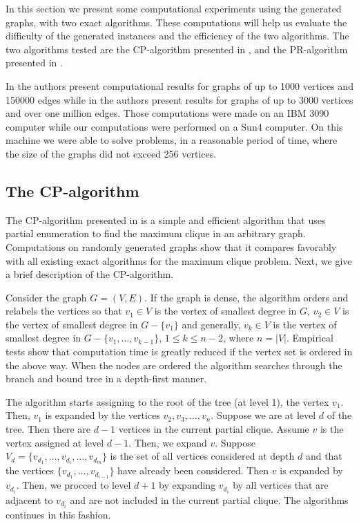 In this section we present some computational experiments using the generated
graphs, with two exact algorithms. These computations will help us evaluate
the difficulty of the generated instances and the efficiency of the two
algorithms. The two algorithms tested are the CP-algorithm presented in
\cite{CP}, and the PR-algorithm presented in \cite{PR}.

In \cite{PR} the authors present computational results for graphs of up to 1000
vertices and 150000 edges while in \cite{CP} the authors present results for
graphs of up to 3000 vertices and over one million edges. Those computations
were made on an IBM 3090 computer while our computations were performed on a
Sun4 computer. On this machine we were able to solve problems, in a reasonable
period of time, where the size of the graphs did not exceed 256 vertices.

\subsection{The CP-algorithm}

The CP-algorithm presented in \cite{CP} is a simple and efficient algorithm
that uses partial enumeration to find the maximum clique in an arbitrary graph.
Computations on randomly generated graphs show
that it compares favorably with all existing exact algorithms for the maximum
clique problem. Next, we give a brief description of the CP-algorithm.

Consider the graph $G = (V,E)$.
If the graph is dense, the algorithm orders and relabels the
vertices so that $v_{1}\in V$ is the vertex of smallest degree in $G$,
$v_{2}\in V$ is the vertex of smallest degree in $G-\{v_{1}\}$ and
generally, $v_{k}\in V$ is the vertex of smallest degree in
$G-\{v_{1},\ldots,v_{k-1}\}$, $1 \leq k \leq n-2$, where $n = |V|$.
Empirical tests show that computation time is greatly reduced if the
vertex set is ordered in the above way. When the nodes are ordered the
algorithm searches through the branch and bound tree in a depth-first manner.

The algorithm starts assigning to the root of the tree (at level 1), the
vertex $v_1$. Then, $v_1$ is expanded by the vertices $v_2,v_3,\dots,v_n$.
Suppose we are at level $d$ of the tree. Then there are $d-1$ vertices in the
current partial clique. Assume $v$ is the vertex assigned at level $d-1$.
Then, we expand $v$. Suppose $V_{d} = \{v_{d_1},\ldots,v_{d_i},\ldots,v_{d_m}\}$
is the set of all vertices considered at depth $d$ and that the vertices
$\{v_{d_1},\ldots,v_{d_{i-1}}\}$ have already been considered. Then $v$ is
expanded by $v_{d_i}$. Then, we procced to level $d+1$ by expanding $v_{d_i}$
by all vertices that are adjacent to $v_{d_i}$ and are not included in the
current partial clique. The algorithms continues in this fashion.

